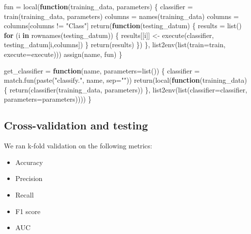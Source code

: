 \documentclass[
]{article}
\newenvironment{Shaded}{\begin{snugshade}}{\end{snugshade}}
\newcommand{\AttributeTok}[1]{\textcolor[rgb]{0.77,0.63,0.00}{#1}}
\newcommand{\ControlFlowTok}[1]{\textcolor[rgb]{0.13,0.29,0.53}{\textbf{#1}}}
\newcommand{\FunctionTok}[1]{\textcolor[rgb]{0.00,0.00,0.00}{#1}}
\newcommand{\NormalTok}[1]{#1}
\newcommand{\OtherTok}[1]{\textcolor[rgb]{0.56,0.35,0.01}{#1}}
\newcommand{\SpecialCharTok}[1]{\textcolor[rgb]{0.00,0.00,0.00}{#1}}
\newcommand{\StringTok}[1]{\textcolor[rgb]{0.31,0.60,0.02}{#1}}
\begin{document}
\begin{Shaded}
\begin{Highlighting}[]
\NormalTok{    fun }\OtherTok{=} \FunctionTok{local}\NormalTok{(}\ControlFlowTok{function}\NormalTok{(training\_data, parameters) \{}
\NormalTok{        classifier }\OtherTok{=} \FunctionTok{train}\NormalTok{(training\_data, parameters)}
\NormalTok{        columns }\OtherTok{=} \FunctionTok{names}\NormalTok{(training\_data)}
\NormalTok{        columns }\OtherTok{=}\NormalTok{ columns[columns }\SpecialCharTok{!=} \StringTok{"Class"}\NormalTok{]}
        \FunctionTok{return}\NormalTok{(}\ControlFlowTok{function}\NormalTok{(testing\_datum) \{}
\NormalTok{            results }\OtherTok{=} \FunctionTok{list}\NormalTok{()}
            \ControlFlowTok{for}\NormalTok{ (i }\ControlFlowTok{in} \FunctionTok{rownames}\NormalTok{(testing\_datum)) \{}
\NormalTok{                results[[i]] }\OtherTok{\textless{}{-}} \FunctionTok{execute}\NormalTok{(classifier, testing\_datum[i,columns])}
\NormalTok{            \}}
            \FunctionTok{return}\NormalTok{(results)}
\NormalTok{        \})}
\NormalTok{    \}, }\FunctionTok{list2env}\NormalTok{(}\FunctionTok{list}\NormalTok{(}\AttributeTok{train=}\NormalTok{train, }\AttributeTok{execute=}\NormalTok{execute)))}
    \FunctionTok{assign}\NormalTok{(name, fun)}
\NormalTok{\}}

\NormalTok{get\_classifier }\OtherTok{=} \ControlFlowTok{function}\NormalTok{(name, }\AttributeTok{parameters=}\FunctionTok{list}\NormalTok{()) \{}
\NormalTok{    classifier }\OtherTok{=} \FunctionTok{match.fun}\NormalTok{(}\FunctionTok{paste}\NormalTok{(}\StringTok{"classify."}\NormalTok{, name, }\AttributeTok{sep=}\StringTok{""}\NormalTok{))}
    \FunctionTok{return}\NormalTok{(}\FunctionTok{local}\NormalTok{(}\ControlFlowTok{function}\NormalTok{(training\_data) \{}
        \FunctionTok{return}\NormalTok{(}\FunctionTok{classifier}\NormalTok{(training\_data, parameters))}
\NormalTok{    \}, }\FunctionTok{list2env}\NormalTok{(}\FunctionTok{list}\NormalTok{(}\AttributeTok{classifier=}\NormalTok{classifier, }\AttributeTok{parameters=}\NormalTok{parameters))))}
\NormalTok{\}}
\end{Highlighting}
\end{Shaded}

\hypertarget{cross-validation-and-testing}{%
\subsection{Cross-validation and
testing}\label{cross-validation-and-testing}}

We ran k-fold validation on the following metrics:
\begin{itemize}
\item Accuracy
\item Precision
\item Recall
\item F1 score
\item AUC
\end{itemize}
\end{document}
